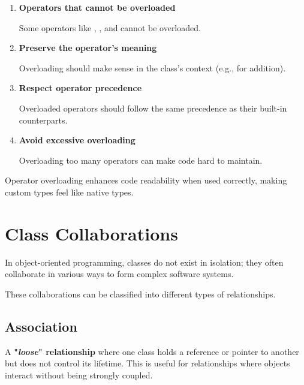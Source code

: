 \begin{tipsblock}
    \begin{enumerate}

        \item \textbf{Operators that cannot be overloaded}
        
        Some operators like \plaintt{::}, , and  cannot be overloaded.
        
        \item \textbf{Preserve the operator's meaning}
        
        Overloading should make sense in the class's context (e.g., \plaintt{+} for addition).
        
        \item \textbf{Respect operator precedence}
        
        Overloaded operators should follow the same precedence as their built-in counterparts.
        
        \item \textbf{Avoid excessive overloading}
        
        Overloading too many operators can make code hard to maintain.

    \end{enumerate}
\end{tipsblock}

Operator overloading enhances code readability when used correctly, making custom types feel like native types.

\newpage



\section{Class Collaborations}

In object-oriented programming, classes do not exist in isolation; they often collaborate in various ways to form complex software systems.

\vspace{0.8em}

These collaborations can be classified into different types of relationships.

\subsection{Association}

A \textbf{"\textit{loose}" relationship} where one class holds a reference or pointer to another but does not control its lifetime. This is useful for relationships where objects interact without being strongly coupled.

